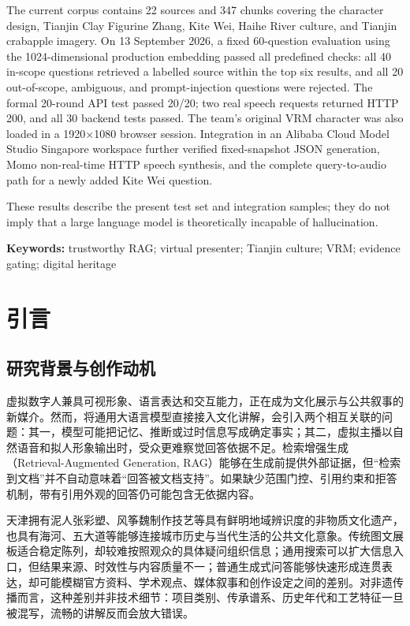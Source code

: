 \documentclass[UTF8,zihao=-4,fontset=none,twoside]{ctexart}
\newcommand{\enkeyword}[1]{\noindent\textbf{Keywords: }#1}
\newcommand{\abstractpara}{\noindent\hspace*{2\ccwd}}
\begin{document}
\abstractpara The current corpus contains 22 sources and 347 chunks covering the character design, Tianjin Clay Figurine Zhang, Kite Wei, Haihe River culture, and Tianjin crabapple imagery. On 13 September 2026, a fixed 60-question evaluation using the 1024-dimensional production embedding passed all predefined checks: all 40 in-scope questions retrieved a labelled source within the top six results, and all 20 out-of-scope, ambiguous, and prompt-injection questions were rejected. The formal 20-round API test passed 20/20; two real speech requests returned HTTP 200, and all 30 backend tests passed. The team's original VRM character was also loaded in a 1920×1080 browser session. Integration in an Alibaba Cloud Model Studio Singapore workspace further verified fixed-snapshot JSON generation, Momo non-real-time HTTP speech synthesis, and the complete query-to-audio path for a newly added Kite Wei question.

\abstractpara These results describe the present test set and integration samples; they do not imply that a large language model is theoretically incapable of hallucination.

\vspace{1.5em}
\enkeyword{trustworthy RAG; virtual presenter; Tianjin culture; VRM; evidence gating; digital heritage}

\clearpage
{}
\renewcommand{\contentsname}{目\quad 录}
\setcounter{tocdepth}{1}
\tableofcontents

\clearpage
\pagestyle{fancy}

\section{引言}

\subsection{研究背景与创作动机}

虚拟数字人兼具可视形象、语言表达和交互能力，正在成为文化展示与公共叙事的新媒介\cite{li2025digitalhuman}。然而，将通用大语言模型直接接入文化讲解，会引入两个相互关联的问题：其一，模型可能把记忆、推断或过时信息写成确定事实；其二，虚拟主播以自然语音和拟人形象输出时，受众更难察觉回答依据不足。检索增强生成（Retrieval-Augmented Generation, RAG）能够在生成前提供外部证据\cite{lewis2020rag}，但“检索到文档”并不自动意味着“回答被文档支持”。如果缺少范围门控、引用约束和拒答机制，带有引用外观的回答仍可能包含无依据内容。

天津拥有泥人张彩塑、风筝魏制作技艺等具有鲜明地域辨识度的非物质文化遗产，也具有海河、五大道等能够连接城市历史与当代生活的公共文化意象。传统图文展板适合稳定陈列，却较难按照观众的具体疑问组织信息；通用搜索可以扩大信息入口，但结果来源、时效性与内容质量不一；普通生成式问答能够快速形成连贯表达，却可能模糊官方资料、学术观点、媒体叙事和创作设定之间的差别。对非遗传播而言，这种差别并非技术细节：项目类别、传承谱系、历史年代和工艺特征一旦被混写，流畅的讲解反而会放大错误。
\end{document}
